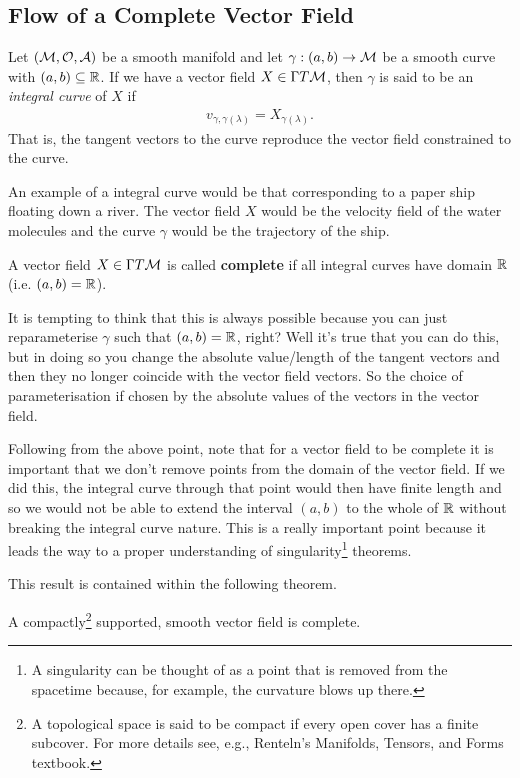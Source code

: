 \documentclass[12pt]{article} %
\begin{document}
\subsection{Flow of a Complete Vector Field}

    Let $(\mathcal{M},\mathcal{O},\mathcal{A})$ be a smooth manifold and let $\gamma:(a,b)\to \mathcal{M}$ be a smooth curve with $(a,b)\subseteq\mathbb{R}$. If we have a vector field $X\in\Gamma T\mathcal{M}$, then $\gamma$ is said to be an \textit{integral curve} of $X$ if
    \begin{align*} 
        v_{\gamma,\gamma(\lambda)} = X_{\gamma(\lambda)}.
    \end{align*} 
    That is, the tangent vectors to the curve reproduce the vector field constrained to the curve. 
\ed 

\bex 
    An example of a integral curve would be that corresponding to a paper ship floating down a river. The vector field $X$ would be the velocity field of the water molecules and the curve $\gamma$ would be the trajectory of the ship. 
\eex 

    A vector field $X\in\Gamma T\mathcal{M}$ is called \textbf{complete} if all integral curves have domain $\mathbb{R}$ (i.e. $(a,b)=\mathbb{R}$).
\ed 

It is tempting to think that this is always possible because you can just reparameterise $\gamma$ such that $(a,b)=\mathbb{R}$, right? Well it's true that you can do this, but in doing so you change the absolute value/length of the tangent vectors and then they no longer coincide with the vector field vectors. So the choice of parameterisation if chosen by the absolute values of the vectors in the vector field. 

Following from the above point, note that for a vector field to be complete it is important that we don't remove points from the domain of the vector field. If we did this, the integral curve through that point would then have finite length and so we would not be able to extend the interval $(a,b)$ to the whole of $\mathbb{R}$ without breaking the integral curve nature. This is a really important point because it leads the way to a proper understanding of singularity\footnote{A singularity can be thought of as a point that is removed from the spacetime because, for example, the curvature blows up there.} theorems.

This result is contained within the following theorem. 

\bt 
    A compactly\footnote{A topological space is said to be compact if every open cover has a finite subcover. For more details see, e.g., Renteln's Manifolds, Tensors, and Forms textbook.} supported, smooth vector field is complete. 
\et 
\end{document}
